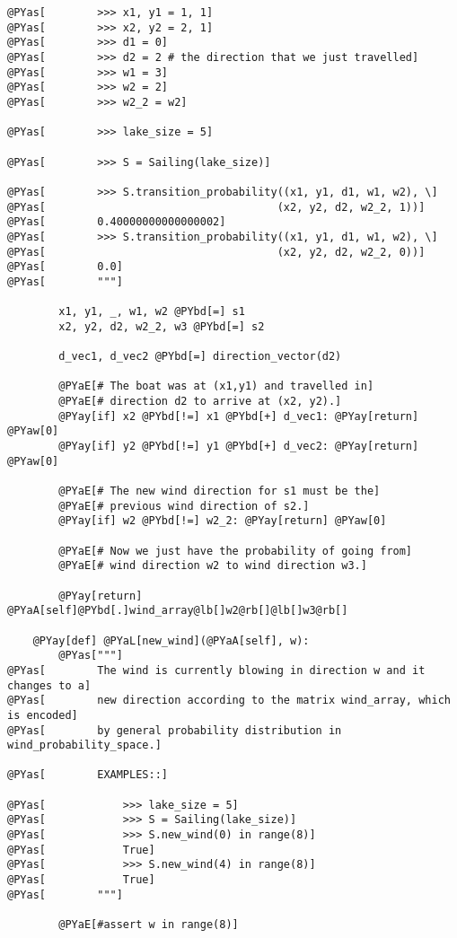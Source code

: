 \begin{Verbatim}[commandchars=@\[\]]
@PYas[        >>> x1, y1 = 1, 1]
@PYas[        >>> x2, y2 = 2, 1]
@PYas[        >>> d1 = 0]
@PYas[        >>> d2 = 2 # the direction that we just travelled]
@PYas[        >>> w1 = 3]
@PYas[        >>> w2 = 2]
@PYas[        >>> w2_2 = w2]

@PYas[        >>> lake_size = 5]

@PYas[        >>> S = Sailing(lake_size)]

@PYas[        >>> S.transition_probability((x1, y1, d1, w1, w2), \]
@PYas[                                    (x2, y2, d2, w2_2, 1))]
@PYas[        0.40000000000000002]
@PYas[        >>> S.transition_probability((x1, y1, d1, w1, w2), \]
@PYas[                                    (x2, y2, d2, w2_2, 0))]
@PYas[        0.0]
@PYas[        """]

        x1, y1, _, w1, w2 @PYbd[=] s1
        x2, y2, d2, w2_2, w3 @PYbd[=] s2

        d_vec1, d_vec2 @PYbd[=] direction_vector(d2)

        @PYaE[# The boat was at (x1,y1) and travelled in]
        @PYaE[# direction d2 to arrive at (x2, y2).]
        @PYay[if] x2 @PYbd[!=] x1 @PYbd[+] d_vec1: @PYay[return] @PYaw[0]
        @PYay[if] y2 @PYbd[!=] y1 @PYbd[+] d_vec2: @PYay[return] @PYaw[0]

        @PYaE[# The new wind direction for s1 must be the]
        @PYaE[# previous wind direction of s2.]
        @PYay[if] w2 @PYbd[!=] w2_2: @PYay[return] @PYaw[0]

        @PYaE[# Now we just have the probability of going from]
        @PYaE[# wind direction w2 to wind direction w3.]

        @PYay[return] @PYaA[self]@PYbd[.]wind_array@lb[]w2@rb[]@lb[]w3@rb[]

    @PYay[def] @PYaL[new_wind](@PYaA[self], w):
        @PYas["""]
@PYas[        The wind is currently blowing in direction w and it changes to a]
@PYas[        new direction according to the matrix wind_array, which is encoded]
@PYas[        by general probability distribution in wind_probability_space.]

@PYas[        EXAMPLES::]

@PYas[            >>> lake_size = 5]
@PYas[            >>> S = Sailing(lake_size)]
@PYas[            >>> S.new_wind(0) in range(8)]
@PYas[            True]
@PYas[            >>> S.new_wind(4) in range(8)]
@PYas[            True]
@PYas[        """]

        @PYaE[#assert w in range(8)]


\end{Verbatim}
